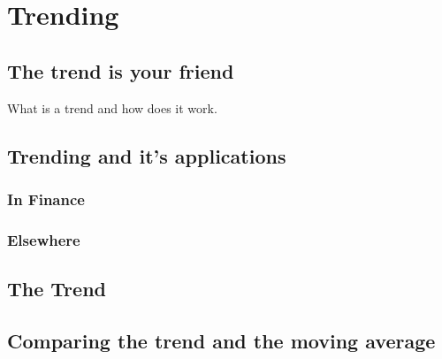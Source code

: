 
\chapter{Trending}

\section{The trend is your friend}
What is a trend and how does it work. 

\section{Trending and it's applications}
\subsection{In Finance}
\subsection{Elsewhere}

\section{The Trend}
\section{Comparing the trend and the moving average}

